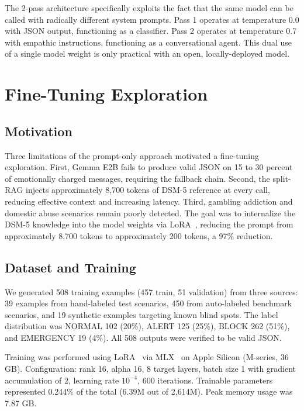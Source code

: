 \documentclass[11pt, a4paper, twocolumn]{article}
\begin{document}
The 2-pass architecture specifically exploits the fact that the same model can be called with radically different system prompts. Pass 1 operates at temperature 0.0 with JSON output, functioning as a classifier. Pass 2 operates at temperature 0.7 with empathic instructions, functioning as a conversational agent. This dual use of a single model weight is only practical with an open, locally-deployed model.

\section{Fine-Tuning Exploration}
\label{sec:finetune}

\subsection{Motivation}

Three limitations of the prompt-only approach motivated a fine-tuning exploration. First, Gemma E2B fails to produce valid JSON on 15 to 30 percent of emotionally charged messages, requiring the fallback chain. Second, the split-RAG injects approximately 8,700 tokens of DSM-5 reference at every call, reducing effective context and increasing latency. Third, gambling addiction and domestic abuse scenarios remain poorly detected. The goal was to internalize the DSM-5 knowledge into the model weights via LoRA~\cite{hu2022lora}, reducing the prompt from approximately 8,700 tokens to approximately 200 tokens, a 97\% reduction.

\subsection{Dataset and Training}

We generated 508 training examples (457 train, 51 validation) from three sources: 39 examples from hand-labeled test scenarios, 450 from auto-labeled benchmark scenarios, and 19 synthetic examples targeting known blind spots. The label distribution was NORMAL 102 (20\%), ALERT 125 (25\%), BLOCK 262 (51\%), and EMERGENCY 19 (4\%). All 508 outputs were verified to be valid JSON.

Training was performed using LoRA~\cite{hu2022lora} via MLX~\cite{mlx2023} on Apple Silicon (M-series, 36 GB). Configuration: rank 16, alpha 16, 8 target layers, batch size 1 with gradient accumulation of 2, learning rate $10^{-4}$, 600 iterations. Trainable parameters represented 0.244\% of the total (6.39M out of 2,614M). Peak memory usage was 7.87 GB.
\end{document}
